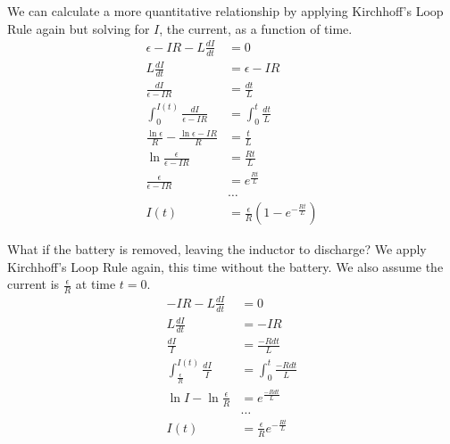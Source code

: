 \documentclass[12pt, titlepage]{article}
\begin{document}
We can calculate a more quantitative relationship by applying Kirchhoff's Loop Rule again but solving for $I$, the current, as a function of time.
\begin{align*}
    \epsilon - IR - L \frac{dI}{dt} &=0 \\
    L\frac{dI}{dt} &= \epsilon - IR \\
    \frac{dI}{\epsilon-IR}& =\frac{dt}{L} \\
    \int_{0}^{I(t)}\frac{dI}{\epsilon-IR}& =\int_{0}^{t}\frac{dt}{L} \\
    \frac{\ln \epsilon}{R}-\frac{\ln \epsilon-IR}{R}&=\frac{t}{L} \\
    \ln \frac{\epsilon}{\epsilon-IR} &= \frac{Rt}{L}\\
    \frac{\epsilon}{\epsilon-IR} &= e^{\frac{Rt}{L}}\\
    & \dots \\
    I(t) &= \boxed{\frac{\epsilon}{R}(1-e^{-\frac{Rt}{L}})}
\end{align*}

What if the battery is removed, leaving the inductor to discharge? We apply Kirchhoff's Loop Rule again, this time without the battery. We also assume the current is $\frac{\epsilon}{R}$ at time $t=0$.
\begin{align*}
    - IR - L \frac{dI}{dt} &=0 \\
    L\frac{dI}{dt} &= -IR \\
    \frac{dI}{I}&=\frac{-Rdt}{L} \\
    \int_{\frac{\epsilon}{R}}^{I(t)}\frac{dI}{I}&=\int_{0}^{t}\frac{-Rdt}{L} \\
    \ln I - \ln \frac{\epsilon}{R}&=e^{\frac{-Rdt}{L}} \\
    & \dots \\
    I(t) &= \boxed{\frac{\epsilon}{R}e^{-\frac{Rt}{L}}}
\end{align*}
\end{document}
